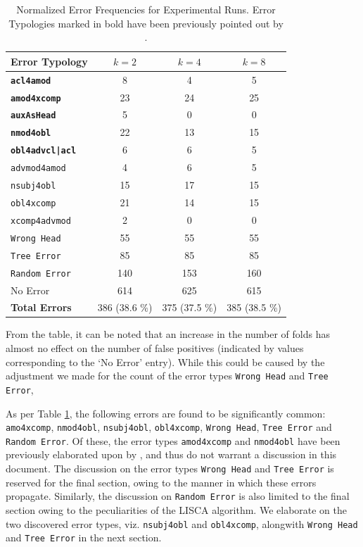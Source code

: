 \begin{table}[H]
    \centering
    \begin{tabular}{|l|c|c|c|}
        \hline
        \textbf{Error Typology} & \textbf{\(k = 2\)} & \textbf{\(k= 4\)} & \textbf{\(k=8\)} \\
        \hline
        \hline
        \textbf{\texttt{acl4amod}} & 8 & 4 & 5 \\
        \textbf{\texttt{amod4xcomp}} & 23 & 24 & 25 \\
        \textbf{\texttt{auxAsHead}} & 5 & 0 & 0 \\
        \textbf{\texttt{nmod4obl}} & 22 & 13 & 15 \\
        \textbf{\texttt{obl4advcl|acl}} & 6 & 6 & 5 \\
        \texttt{advmod4amod} & 4 & 6 & 5 \\
        \texttt{nsubj4obl} & 15 & 17 & 15 \\
        \texttt{obl4xcomp} & 21 & 14 & 15 \\
        \texttt{xcomp4advmod} & 2 & 0 & 0 \\
        \texttt{Wrong Head} & 55 & 55 & 55 \\
        \texttt{Tree Error} & 85 & 85 & 85 \\
        \texttt{Random Error} & 140 & 153 & 160 \\
        No Error & 614 & 625 & 615 \\
        \hline
        \hline
        \textbf{Total Errors} & 386 (38.6 \%) & 375 (37.5 \%) & 385 (38.5 \%) \\
        \hline
    \end{tabular}
    \caption[Normalized Error Frequencies for Experimental Runs]{Normalized Error Frequencies for Experimental Runs. Error Typologies marked in bold have been previously pointed out by \cite{alzetta2017dangerous}.}
    \label{tab:normalized_experimental_lisca}
\end{table}

From the table, it can be noted that an increase in the number of folds has almost no effect on the number of false positives (indicated by values corresponding to the `No Error' entry). While this could be caused by the adjustment we made for the count of the error types \texttt{Wrong Head} and \texttt{Tree Error}, 

As per Table \ref{tab:normalized_experimental_lisca}, the following errors are found to be significantly common: \texttt{amo4xcomp}, \texttt{nmod4obl}, \texttt{nsubj4obl}, \texttt{obl4xcomp}, \texttt{Wrong Head}, \texttt{Tree Error} and \texttt{Random Error}. Of these, the error types \texttt{amod4xcomp} and \texttt{nmod4obl} have been previously elaborated upon by \cite{alzetta2017dangerous}, and thus do not warrant a discussion in this document. The discussion on the error types \texttt{Wrong Head} and \texttt{Tree Error} is reserved for the final section, owing to the manner in which these errors propagate. Similarly, the discussion on \texttt{Random Error} is also limited to the final section owing to the peculiarities of the LISCA algorithm. We elaborate on the two discovered error types, viz. \texttt{nsubj4obl} and \texttt{obl4xcomp}, alongwith \texttt{Wrong Head} and \texttt{Tree Error} in the next section.

